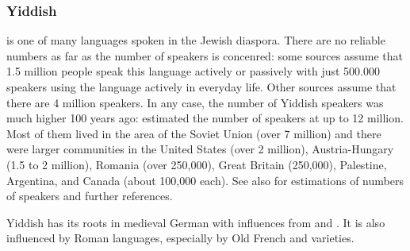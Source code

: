 




\subsubsection{Yiddish}

 is one of many languages spoken in the Jewish diaspora. There are no reliable numbers
as far as the number of speakers is concenred: some sources assume that
1.5 million people speak this language actively or passively with just 500.000 speakers using the language
actively in everyday life. Other sources assume that there are 4 million
speakers. In any case, the number of Yiddish speakers was much
higher 100 years ago: \citet[]{Birnbaum1915a-u} estimated the number of speakers at up to 12 million. Most of
them lived in the area of the Soviet Union (over 7 million) and there were larger communities in the United States (over 2 million), Austria-Hungary
(1.5 to 2 million), Romania (over 250,000), Great Britain
(250,000), Palestine, Argentina, and Canada (about 100,000 each). See also  for
estimations of numbers of speakers and further references.

Yiddish has its roots
in medieval German with influences from  and . It is also influenced by
Roman languages, especially by Old French and  varieties.


